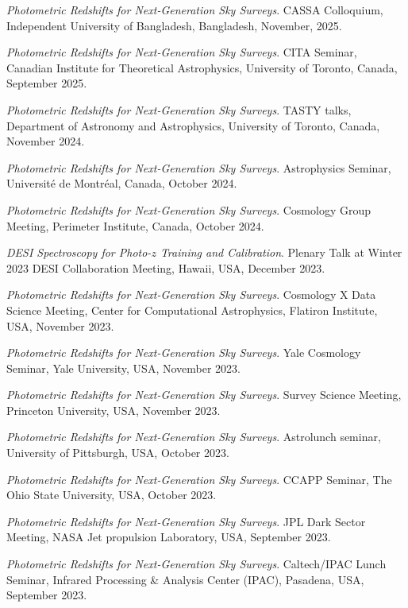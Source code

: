 
 \begin{etaremune}[leftmargin=40pt,labelsep=10pt]
    \item \textit{Photometric Redshifts for Next-Generation Sky Surveys}. CASSA Colloquium, Independent University of Bangladesh, Bangladesh, November, 2025.
    \item \textit{Photometric Redshifts for Next-Generation Sky Surveys}. CITA Seminar, Canadian Institute for Theoretical Astrophysics, University of Toronto, Canada, September 2025.
    \item \textit{Photometric Redshifts for Next-Generation Sky Surveys}. TASTY talks, Department of Astronomy and Astrophysics, University of Toronto, Canada, November 2024.
    \item \textit{Photometric Redshifts for Next-Generation Sky Surveys}. Astrophysics Seminar, Université de Montréal, Canada, October 2024.
    \item \textit{Photometric Redshifts for Next-Generation Sky Surveys}. Cosmology Group Meeting, Perimeter Institute, Canada, October 2024.
     \item \textit{DESI Spectroscopy for Photo-$z$ Training and Calibration}. Plenary Talk at Winter 2023 DESI Collaboration Meeting, Hawaii, USA, December 2023.
    \item \textit{Photometric Redshifts for Next-Generation Sky Surveys}. Cosmology X Data Science Meeting, Center for Computational Astrophysics, Flatiron Institute, USA, November 2023.
    \item \textit{Photometric Redshifts for Next-Generation Sky Surveys}. Yale Cosmology Seminar, Yale University, USA, November 2023.
    \item \textit{Photometric Redshifts for Next-Generation Sky Surveys}. Survey Science Meeting, Princeton University, USA, November 2023.
    \item \textit{Photometric Redshifts for Next-Generation Sky Surveys}. Astrolunch seminar, University of Pittsburgh, USA, October 2023.
    \item \textit{Photometric Redshifts for Next-Generation Sky Surveys}. CCAPP Seminar, The Ohio State University, USA, October 2023.
    \item \textit{Photometric Redshifts for Next-Generation Sky Surveys}. JPL Dark Sector Meeting, NASA Jet propulsion Laboratory, USA, September 2023.
    \item \textit{Photometric Redshifts for Next-Generation Sky Surveys}. Caltech/IPAC Lunch Seminar, Infrared Processing \& Analysis Center (IPAC), Pasadena, USA, September 2023.

\end{etaremune}
